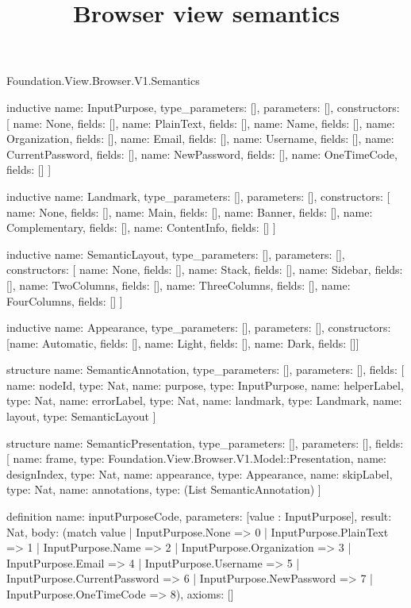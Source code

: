 \begin{lexlean}{Foundation.View.Browser.V1.Semantics}
\title{Browser view semantics}
\begin{semanticmodule}
inductive{
  name: InputPurpose,
  type_parameters: [],
  parameters: [],
  constructors: [
    {name: None, fields: []},
    {name: PlainText, fields: []},
    {name: Name, fields: []},
    {name: Organization, fields: []},
    {name: Email, fields: []},
    {name: Username, fields: []},
    {name: CurrentPassword, fields: []},
    {name: NewPassword, fields: []},
    {name: OneTimeCode, fields: []}
  ]
}

inductive{
  name: Landmark,
  type_parameters: [],
  parameters: [],
  constructors: [
    {name: None, fields: []},
    {name: Main, fields: []},
    {name: Banner, fields: []},
    {name: Complementary, fields: []},
    {name: ContentInfo, fields: []}
  ]
}

inductive{
  name: SemanticLayout,
  type_parameters: [],
  parameters: [],
  constructors: [
    {name: None, fields: []},
    {name: Stack, fields: []},
    {name: Sidebar, fields: []},
    {name: TwoColumns, fields: []},
    {name: ThreeColumns, fields: []},
    {name: FourColumns, fields: []}
  ]
}

inductive{
  name: Appearance,
  type_parameters: [],
  parameters: [],
  constructors: [{name: Automatic, fields: []}, {name: Light, fields: []}, {name: Dark, fields: []}]
}

structure{
  name: SemanticAnnotation,
  type_parameters: [],
  parameters: [],
  fields: [
    {name: nodeId, type: Nat},
    {name: purpose, type: InputPurpose},
    {name: helperLabel, type: Nat},
    {name: errorLabel, type: Nat},
    {name: landmark, type: Landmark},
    {name: layout, type: SemanticLayout}
  ]
}

structure{
  name: SemanticPresentation,
  type_parameters: [],
  parameters: [],
  fields: [
    {name: frame, type: Foundation.View.Browser.V1.Model::Presentation},
    {name: designIndex, type: Nat},
    {name: appearance, type: Appearance},
    {name: skipLabel, type: Nat},
    {name: annotations, type: (List SemanticAnnotation)}
  ]
}

definition{
  name: inputPurposeCode,
  parameters: [value : InputPurpose],
  result: Nat,
  body: (match value
    | InputPurpose.None => 0
    | InputPurpose.PlainText => 1
    | InputPurpose.Name => 2
    | InputPurpose.Organization => 3
    | InputPurpose.Email => 4
    | InputPurpose.Username => 5
    | InputPurpose.CurrentPassword => 6
    | InputPurpose.NewPassword => 7
    | InputPurpose.OneTimeCode => 8),
  axioms: []
}


\end{semanticmodule}
\end{lexlean}
